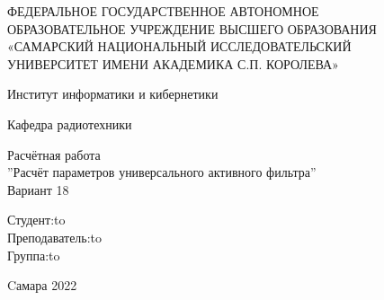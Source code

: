 \begin{titlepage}
\newpage
\doublespacing
\begin{center}
ФЕДЕРАЛЬНОЕ ГОСУДАРСТВЕННОЕ АВТОНОМНОЕ\\
ОБРАЗОВАТЕЛЬНОЕ УЧРЕЖДЕНИЕ ВЫСШЕГО ОБРАЗОВАНИЯ\\
«САМАРСКИЙ НАЦИОНАЛЬНЫЙ ИССЛЕДОВАТЕЛЬСКИЙ\\
УНИВЕРСИТЕТ ИМЕНИ АКАДЕМИКА С.П. КОРОЛЕВА»	
 \\
\end{center}

\vspace{5em}

\begin{center}
 Институт информатики и кибернетики \\ 
\end{center}

\begin{center}
Кафедра радиотехники \\ 
\end{center}


\vspace{3em}

\begin{center}
{Расчётная работа\\ ''Расчёт параметров универсального активного фильтра''\\ Вариант 18}
\end{center}

\vspace{14em}



\newbox{\lbox}
\newlength{\maxl}
\setlength{\maxl}{\wd\lbox}
\hfill\parbox{6cm}{
\hspace*{4cm}\hspace*{-4cm}Студент:\hfill\hbox to\\
\hspace*{4cm}\hspace*{-4cm}Преподаватель:\hfill\hbox to\\
\hspace*{4cm}\hspace*{-4cm}Группа:\hfill\hbox to\\
}


\vspace{\fill}

\begin{center}
Cамара 2022
\end{center}

\end{titlepage}